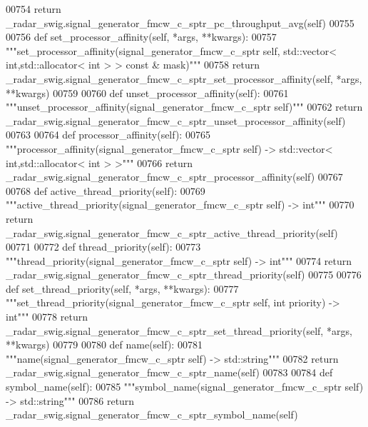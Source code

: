 \begin{DoxyCode}
{{{{00754         \textcolor{keywordflow}{return} \_radar\_swig.signal\_generator\_fmcw\_c\_sptr\_pc\_throughput\_avg(self)
00755 
00756     \textcolor{keyword}{def }set_processor_affinity(self, *args, **kwargs):
00757         \textcolor{stringliteral}{"""set\_processor\_affinity(signal\_generator\_fmcw\_c\_sptr self, std::vector< int,std::allocator< int >
       > const & mask)"""}
00758         \textcolor{keywordflow}{return} \_radar\_swig.signal\_generator\_fmcw\_c\_sptr\_set\_processor\_affinity(self, *args, **kwargs)
00759 
00760     \textcolor{keyword}{def }unset_processor_affinity(self):
00761         \textcolor{stringliteral}{"""unset\_processor\_affinity(signal\_generator\_fmcw\_c\_sptr self)"""}
00762         \textcolor{keywordflow}{return} \_radar\_swig.signal\_generator\_fmcw\_c\_sptr\_unset\_processor\_affinity(self)
00763 
00764     \textcolor{keyword}{def }processor_affinity(self):
00765         \textcolor{stringliteral}{"""processor\_affinity(signal\_generator\_fmcw\_c\_sptr self) -> std::vector< int,std::allocator< int >
       >"""}
00766         \textcolor{keywordflow}{return} \_radar\_swig.signal\_generator\_fmcw\_c\_sptr\_processor\_affinity(self)
00767 
00768     \textcolor{keyword}{def }active_thread_priority(self):
00769         \textcolor{stringliteral}{"""active\_thread\_priority(signal\_generator\_fmcw\_c\_sptr self) -> int"""}
00770         \textcolor{keywordflow}{return} \_radar\_swig.signal\_generator\_fmcw\_c\_sptr\_active\_thread\_priority(self)
00771 
00772     \textcolor{keyword}{def }thread_priority(self):
00773         \textcolor{stringliteral}{"""thread\_priority(signal\_generator\_fmcw\_c\_sptr self) -> int"""}
00774         \textcolor{keywordflow}{return} \_radar\_swig.signal\_generator\_fmcw\_c\_sptr\_thread\_priority(self)
00775 
00776     \textcolor{keyword}{def }set_thread_priority(self, *args, **kwargs):
00777         \textcolor{stringliteral}{"""set\_thread\_priority(signal\_generator\_fmcw\_c\_sptr self, int priority) -> int"""}
00778         \textcolor{keywordflow}{return} \_radar\_swig.signal\_generator\_fmcw\_c\_sptr\_set\_thread\_priority(self, *args, **kwargs)
00779 
00780     \textcolor{keyword}{def }name(self):
00781         \textcolor{stringliteral}{"""name(signal\_generator\_fmcw\_c\_sptr self) -> std::string"""}
00782         \textcolor{keywordflow}{return} \_radar\_swig.signal\_generator\_fmcw\_c\_sptr\_name(self)
00783 
00784     \textcolor{keyword}{def }symbol_name(self):
00785         \textcolor{stringliteral}{"""symbol\_name(signal\_generator\_fmcw\_c\_sptr self) -> std::string"""}
00786         \textcolor{keywordflow}{return} \_radar\_swig.signal\_generator\_fmcw\_c\_sptr\_symbol\_name(self)
}}}}
\end{DoxyCode}
